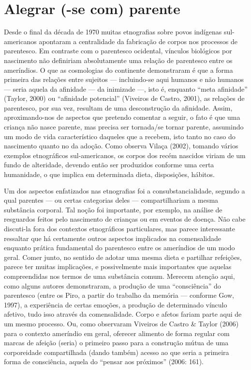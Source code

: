 \section{Alegrar (-se com) parente}

Desde o final da década de 1970 muitas etnografias sobre povos indígenas
sul-americanos apontaram a centralidade da fabricação de corpos nos
processos de parentesco. Em contraste com o parentesco ocidental,
vínculos biológicos por nascimento não definiriam absolutamente uma
relação de parentesco entre os ameríndios. O que as cosmologias do
continente demonstraram é que a forma primeira das relações entre
sujeitos — incluindo-se aqui humanos e não humanos — seria aquela da
afinidade — da inimizade —, isto é, enquanto ``meta afinidade'' (Taylor,
2000) ou ``afinidade potencial'' (Viveiros de Castro, 2001), as relações
de parentesco, por sua vez, resultam de uma desconstrução da afinidade.
Assim, aproximando-nos de aspectos que pretendo comentar a seguir, o
fato é que uma criança não nasce parente, mas precisa ser tornada/se
tornar parente, assumindo um modo de vida característico daqueles que a
recebem, isto tanto no caso do nascimento quanto no da adoção. Como
observa Vilaça (2002), tomando vários exemplos etnográficos
sul-americanos, os corpos dos recém nascidos viriam de um fundo de
alteridade, devendo então ser produzidos conforme uma certa humanidade,
o que implica em determinada dieta, disposições, hábitos.

Um dos aspectos enfatizados nas etnografias foi a consubstancialidade,
segundo a qual parentes — ou certas categorias deles — compartilhariam
a mesma substância corporal. Tal noção foi importante, por exemplo, na
análise de resguardos feitos pelo nascimento de crianças ou em eventos
de doença. Não cabe discuti-la fora dos contextos etnográficos
particulares, mas parece interessante ressaltar que há certamente
outros aspectos implicados na comensalidade enquanto prática
fundamental do parentesco entre os ameríndios de um modo geral. Comer
junto, no sentido de adotar uma mesma dieta e partilhar refeições,
parece ter muitas implicações, e possivelmente mais importantes que
aquelas compreendidas nos termos de uma substância comum. Merecem
atenção aqui, como alguns autores demonstraram, a produção de uma
``consciência'' do parentesco (entre os Piro, a partir do trabalho da
memória — conforme Gow, 1997), a experiência de certas emoções, a
produção de determinado vínculo afetivo, tudo isso através da
comensalidade. Corpo e afetos fariam parte aqui de um mesmo processo.
Ou, como observaram Viveiros de Castro \& Taylor (2006) para o contexto
ameríndio em geral, oferecer alimento de forma regular com marcas de
afeição (seria) o primeiro passo para a construção mútua de uma
corporeidade compartilhada (dando também) acesso ao que seria a
primeira forma de consciência, aquela do ``pensar aos próximos'' (2006:
161).

